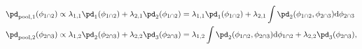 \begin{align}
  \pd_{\text{pool}, 1}(\phi_{1 \cap 2}) &\propto \lambda_{1, 1}\pd_{1}(\phi_{1 \cap 2}) + \lambda_{2, 1}\pd_{2}(\phi_{1 \cap 2}) = \lambda_{1, 1}\pd_{1}(\phi_{1 \cap 2}) + \lambda_{2, 1}\int\pd_{2}(\phi_{1 \cap 2}, \phi_{2 \cap 3}) \text{d}\phi_{2 \cap 3} 
  \label{eqn:silly-linear-solution-1}
  \\
  \pd_{\text{pool}, 2}(\phi_{2 \cap 3}) &\propto \lambda_{1, 2}\pd_{2}(\phi_{2 \cap 3}) + \lambda_{2, 2}\pd_{3}(\phi_{2 \cap 3}) = \lambda_{1, 2}\int\pd_{2}(\phi_{1 \cap 2}, \phi_{2 \cap 3})\text{d}\phi_{1 \cap 2} + \lambda_{2, 2}\pd_{3}(\phi_{2 \cap 3}),
  \label{eqn:silly-linear-solution-2}
\end{align}